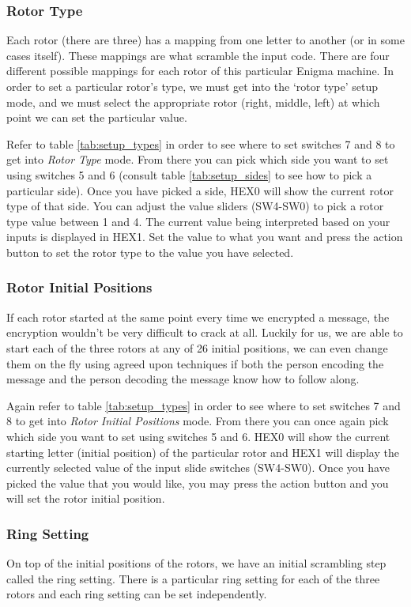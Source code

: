 \documentclass{article}
\begin{document}
\subsubsection{Rotor Type}
Each rotor (there are three) has a mapping from one letter to another (or in some cases itself). These mappings are what scramble the input code. There are four different possible mappings for each rotor of this particular Enigma machine. In order to set a particular rotor's type, we must get into the `rotor type' setup mode, and we must select the appropriate rotor (right, middle, left) at which point we can set the particular value. 

Refer to table \ref{tab:setup_types} in order to see where to set switches 7 and 8 to get into \textit{Rotor Type} mode. From there you can pick which side you want to set using switches 5 and 6 (consult table \ref{tab:setup_sides} to see how to pick a particular side). Once you have picked a side, HEX0 will show the current rotor type of that side. You can adjust the value sliders (SW4-SW0) to pick a rotor type value between 1 and 4. The current value being interpreted based on your inputs is displayed in HEX1. Set the value to what you want and press the action button to set the rotor type to the value you have selected. 


\subsubsection{Rotor Initial Positions}
If each rotor started at the same point every time we encrypted a message, the encryption wouldn't be very difficult to crack at all. Luckily for us, we are able to start each of the three rotors at any of 26 initial positions, we can even change them on the fly using agreed upon techniques if both the person encoding the message and the person decoding the message know how to follow along. 

Again refer to table \ref{tab:setup_types} in order to see where to set switches 7 and 8 to get into \textit{Rotor Initial Positions} mode. From there you can once again pick which side you want to set using switches 5 and 6. HEX0 will show the current starting letter (initial position) of the particular rotor and HEX1 will display the currently selected value of the input slide switches (SW4-SW0). Once you have picked the value that you would like, you may press the action button and you will set the rotor initial position. 

\subsubsection{Ring Setting}
On top of the initial positions of the rotors, we have an initial scrambling step called the ring setting. There is a particular ring setting for each of the three rotors and each ring setting can be set independently. 
\end{document}
